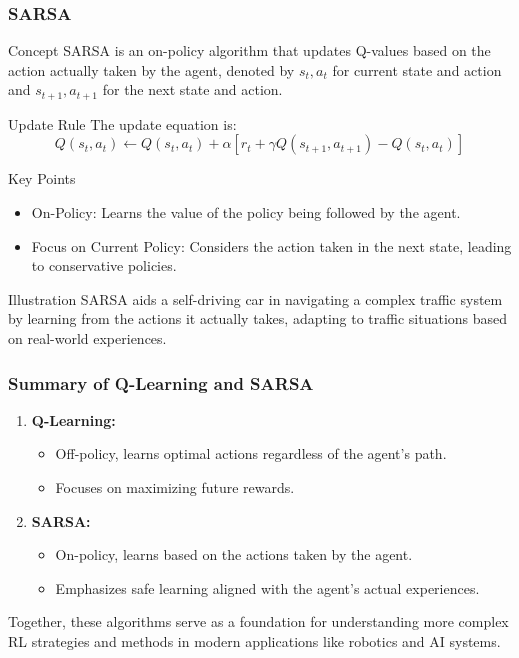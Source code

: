 \documentclass[aspectratio=169]{beamer}
\begin{document}
\begin{frame}[fragile]
    \frametitle{SARSA}
    \begin{block}{Concept}
        SARSA is an on-policy algorithm that updates Q-values based on the action actually taken by the agent, denoted by \( s_t, a_t \) for current state and action and \( s_{t+1}, a_{t+1} \) for the next state and action.
    \end{block}

    \begin{block}{Update Rule}
        The update equation is:
        \begin{equation}
        Q(s_t, a_t) \leftarrow Q(s_t, a_t) + \alpha \left[ r_t + \gamma Q(s_{t+1}, a_{t+1}) - Q(s_t, a_t) \right]
        \end{equation}
    \end{block}
    
    \begin{block}{Key Points}
        \begin{itemize}
            \item On-Policy: Learns the value of the policy being followed by the agent.
            \item Focus on Current Policy: Considers the action taken in the next state, leading to conservative policies.
        \end{itemize}
    \end{block}

    \begin{block}{Illustration}
        SARSA aids a self-driving car in navigating a complex traffic system by learning from the actions it actually takes, adapting to traffic situations based on real-world experiences.
    \end{block}
\end{frame}

\begin{frame}[fragile]
    \frametitle{Summary of Q-Learning and SARSA}
    \begin{enumerate}
        \item \textbf{Q-Learning:}
        \begin{itemize}
            \item Off-policy, learns optimal actions regardless of the agent's path.
            \item Focuses on maximizing future rewards.
        \end{itemize}
        
        \item \textbf{SARSA:}
        \begin{itemize}
            \item On-policy, learns based on the actions taken by the agent.
            \item Emphasizes safe learning aligned with the agent’s actual experiences.
        \end{itemize}
    \end{enumerate}

    Together, these algorithms serve as a foundation for understanding more complex RL strategies and methods in modern applications like robotics and AI systems.
\end{frame}
\end{document}
